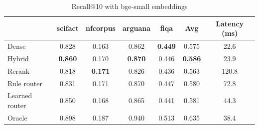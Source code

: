 \begin{table}[t]
\centering
\caption{Recall@10 with bge-small embeddings}
\label{tab:recall_bge-small}
\begin{tabular}{lcccccc}
\toprule
 & scifact & nfcorpus & arguana & fiqa & Avg & Latency (ms) \\
\midrule
Dense & 0.828 & 0.163 & 0.862 & \textbf{0.449} & 0.575 & 22.6 \\
Hybrid & \textbf{0.860} & 0.170 & \textbf{0.870} & 0.446 & \textbf{0.586} & 23.9 \\
Rerank & 0.818 & \textbf{0.171} & 0.826 & 0.436 & 0.563 & 120.8 \\
\midrule
Rule router & 0.831 & 0.171 & 0.870 & 0.447 & 0.580 & 72.8 \\
Learned router & 0.850 & 0.168 & 0.865 & 0.441 & 0.581 & 44.3 \\
Oracle & 0.898 & 0.187 & 0.940 & 0.513 & 0.635 & 38.4 \\
\bottomrule
\end{tabular}
\end{table}